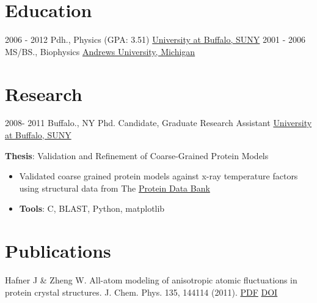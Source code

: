 \documentclass[letterpaper]{twentysecondcv} %
\begin{document}
\makeprofile %

\section{Education}

\begin{twenty} %
	\twentyitem
    	{2006 - 2012}
        {}
        {Pdh., Physics \textnormal{(GPA: 3.51)}}
        {\href{http://www.buffalo.edu/}{University at Buffalo, SUNY}}
        {}{}
	\twentyitem
    	{2001 - 2006}
		{}
        {MS/BS., Biophysics}
        {\href{http://www.andrews.edu/}{Andrews University, Michigan}}
        {}{}
\end{twenty}

\section{Research}
\begin{twenty}
	\twentyitem
    	{2008- 2011}
		{Buffalo., NY}
        {Phd. Candidate, Graduate Research Assistant}
        {\href{http://www.buffalo.edu/}{University at Buffalo, SUNY}}
        {}
        {
       	\textbf{Thesis}: Validation and Refinement of Coarse-Grained Protein Models
        {\begin{itemize}
            \item Validated coarse grained protein models against x-ray temperature factors using structural data from The \href{http://www.rcsb.org/pdb/home/home.do}{Protein Data Bank}
            \item \textbf{Tools}: C, BLAST, Python, matplotlib \vspace{2mm}
		\end{itemize}}
        }
\end{twenty}

\section{Publications}

Hafner J \& Zheng W. All-atom modeling of anisotropic atomic fluctuations in protein crystal structures. J. Chem. Phys. 135, 144114 (2011).
   \href{http://www.acsu.buffalo.edu/~wjzheng/Hafner_jcp2011.pdf}{PDF}
   \href{http://aip.scitation.org/doi/10.1063/1.3646312}{DOI}
\end{document}
